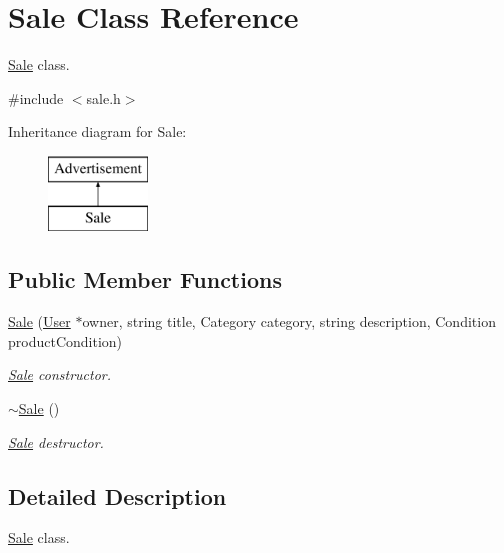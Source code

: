 \hypertarget{class_sale}{}\section{Sale Class Reference}
\label{class_sale}


\hyperlink{class_sale}{Sale} class.  




{\ttfamily \#include $<$sale.\+h$>$}

Inheritance diagram for Sale\+:\begin{figure}[H]
\begin{center}
\leavevmode
\includegraphics[height=2.000000cm]{class_sale}
\end{center}
\end{figure}
\subsection*{Public Member Functions}
\begin{DoxyCompactItemize}
\item 
\hyperlink{class_sale_ae5f5658a042eaaa8c080c1282d79f9ae}{Sale} (\hyperlink{class_user}{User} $\ast$owner, string title, Category category, string description, Condition product\+Condition)
\begin{DoxyCompactList}\small\item\em \hyperlink{class_sale}{Sale} constructor. \end{DoxyCompactList}\item 
\hypertarget{class_sale_ab6cb58a5d618fc4e4988b55342f21b21}{}\hyperlink{class_sale_ab6cb58a5d618fc4e4988b55342f21b21}{$\sim$\+Sale} ()\label{class_sale_ab6cb58a5d618fc4e4988b55342f21b21}

\begin{DoxyCompactList}\small\item\em \hyperlink{class_sale}{Sale} destructor. \end{DoxyCompactList}\end{DoxyCompactItemize}


\subsection{Detailed Description}
\hyperlink{class_sale}{Sale} class. 

